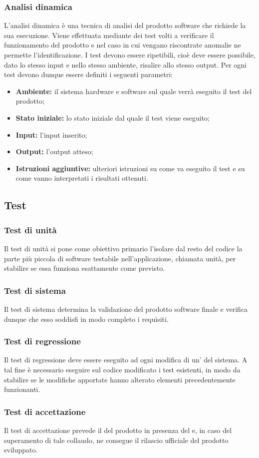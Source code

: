\documentclass[../NormeDiProgetto.tex]{subfiles}
\begin{document}
\subsubsection{Analisi dinamica}
L’analisi dinamica è una tecnica di analisi del prodotto software che richiede la sua esecuzione. Viene effettuata mediante dei test volti a verificare il funzionamento del prodotto e nel
caso in cui vengano riscontrate anomalie ne permette l’identificazione.
I test devono essere ripetibili, cioè deve essere possibile, dato lo stesso input e nello
stesso ambiente, risalire allo stesso output. Per ogni test devono dunque essere definiti
i seguenti parametri:
\begin{itemize}
\item \textbf{Ambiente:} il sistema hardware e software sul quale verrà eseguito il test del
prodotto;
\item \textbf{Stato iniziale:} lo stato iniziale dal quale il test viene eseguito;
\item \textbf{Input:} l’input inserito;
\item \textbf{Output:} l’output atteso;
\item \textbf{Istruzioni aggiuntive:} ulteriori istruzioni su come va eseguito il test e su come
vanno interpretati i risultati ottenuti.
\end{itemize}
\subsection{Test}
\subsubsection{Test di unità}
Il test di unità si pone come obiettivo primario l’isolare dal resto del codice la parte
più piccola di software testabile nell’applicazione, chiamata unità, per stabilire se essa
funziona esattamente come previsto.
\subsubsection{Test di sistema}
Il test di sistema determina la validazione del prodotto software finale e verifica dunque che esso soddisfi in modo completo i requisiti.
\subsubsection{Test di regressione}
Il test di regressione deve essere eseguito ad ogni modifica di un’ del
sistema. A tal fine è necessario eseguire sul codice modificato i test esistenti, in modo da
stabilire se le modifiche apportate hanno alterato elementi precedentemente funzionanti.
\subsubsection{Test di accettazione}
Il test di accettazione prevede il  del prodotto in presenza del  e,
in caso del superamento di tale collaudo, ne consegue il rilascio ufficiale del prodotto
sviluppato.
\end{document}
